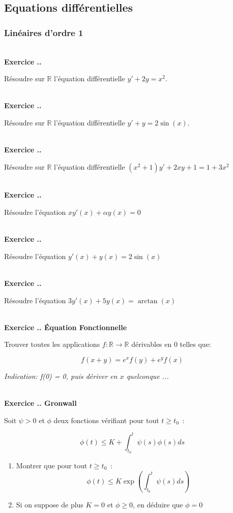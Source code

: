 \documentclass{article}
\newcommand{\mb}[1]{\mathbb{#1}}
\newcounter{exo}
\newcommand{\exercice}[1][\null]{\textbf{\\ Exercice \thesection.\theexo. #1} \addtocounter{exo}{1}}
\begin{document}
\subsection{Equations différentielles}

\subsubsection{Linéaires d'ordre 1}

\exercice

Résoudre sur $\mb{R}$ l'équation différentielle $y' + 2y = x^2$.

\exercice

Résoudre sur $\mb{R}$ l'équation différentielle  $y' + y=2 \sin(x)$.


\exercice

Résoudre sur $\mb{R}$ l'équation différentielle $(x^2+1)y'+2xy+1= 1 + 3x^2 $

\exercice 

Résoudre l'équation $x y'(x) + \alpha y(x) = 0$ 


\exercice 

Résoudre l'équation $y'(x) + y(x) = 2 \sin (x)$

\exercice 

Résoudre l'équation $3 y'(x) + 5 y(x) = \arctan (x)$

\exercice[Équation Fonctionnelle]

Trouver toutes les applications $f : \mb{R} \to \mb{R}$ 
dérivables en $0$ telles que: 

\begin{equation*}
    f(x + y) = e^x f(y) + e^y f(x)
\end{equation*}

\emph{Indication: f(0) = 0, puis dériver en $x$ quelconque ...}

\exercice[Gronwall]

Soit $\psi > 0$ et $\phi$ deux fonctions vérifiant 
pour tout $t \geq t_0$~:

\begin{equation*}
    \phi (t) \leq K + \int_{t_0}^t \psi (s) \phi (s) ds
\end{equation*}

\begin{enumerate}
    \item Montrer que pour tout $t \geq t_0$~:
\begin{equation*}
    \phi (t) \leq K \exp \left(  \int_{t_0}^t \psi (s) ds \right) 
\end{equation*}

    \item Si on suppose de plus $K = 0$ et $\phi \geq 0$, 
        en déduire que $\phi = 0$
\end{enumerate}
\end{document}
